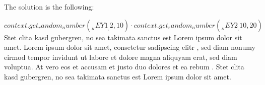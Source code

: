 The solution is the following:
\begin{Solution}
\solitem ${{context.get_random_number(__KEY1__, 2, 10)}} \cdot {{context.get_random_number(__KEY2__, 10, 20)}}$
\solitem Stet clita kasd gubergren,  no sea takimata sanctus est Lorem ipsum dolor sit amet. Lorem ipsum dolor sit amet, consetetur sadipscing elitr , sed diam nonumy eirmod tempor invidunt ut labore et dolore magna aliquyam erat, sed diam voluptua. 
\solitem At vero eos et accusam et justo duo dolores et ea rebum . Stet clita kasd gubergren, no sea takimata sanctus est Lorem ipsum dolor sit amet. 
\end{Solution}